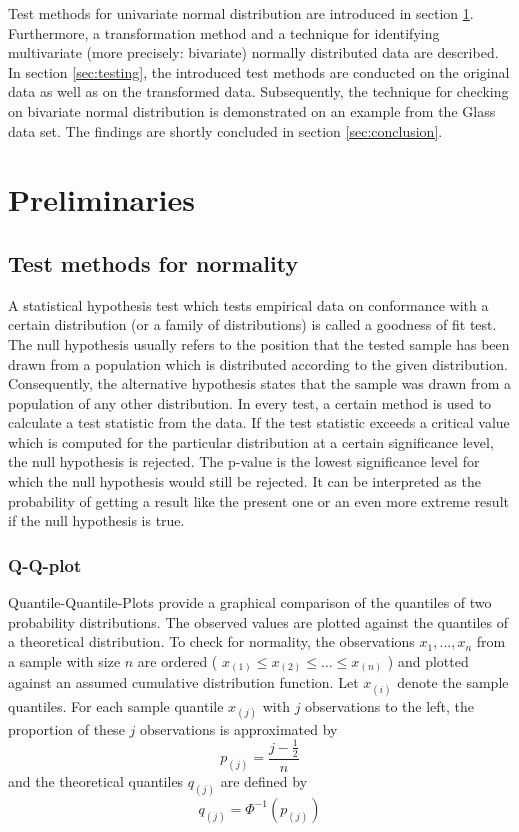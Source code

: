 \documentclass[a4paper, 12pt, titlepage, headsepline, listof = totoc, bibliography = totoc, numbers = noenddot]{scrartcl}
\begin{document}
Test methods for univariate normal distribution are introduced in section \ref{sec:preliminaries}. Furthermore, a transformation method and a technique for identifying multivariate (more precisely: bivariate) normally distributed data are described. In section \ref{sec:testing}, the introduced test methods are conducted on the original data as well as on the transformed data. Subsequently, the technique for checking on bivariate normal distribution is demonstrated on an example from the Glass data set. The findings are shortly concluded in section \ref{sec:conclusion}.

\newpage
\section{Preliminaries}\label{sec:preliminaries}

\subsection{Test methods for normality}\label{sec:methods}

A statistical hypothesis test which tests empirical data on conformance with a certain distribution (or a family of distributions) is called a goodness of fit test. The null hypothesis usually refers to the position that the tested sample has been drawn from a population which is distributed according to the given distribution. Consequently, the alternative hypothesis states that the sample was drawn from a population of any other distribution. In every test, a certain method is used to calculate a test statistic from the data. If the test statistic exceeds a critical value which is computed for the particular distribution at a certain significance level, the null hypothesis is rejected. The p-value is the lowest significance level for which the null hypothesis would still be rejected. It can be interpreted as the probability of getting a result like the present one or an even more extreme result if the null hypothesis is true.

\subsubsection{Q-Q-plot}\label{sec:qq-theoretical}

Quantile-Quantile-Plots provide a graphical comparison of the quantiles of two probability distributions. The observed values are plotted against the quantiles of a theoretical distribution. To check for normality, the observations $x_1, \dots, x_n$ from a sample with size $n$ are ordered ( $x_{(1)} \le x_{(2)} \le \dots \le x_{(n)}$ ) and plotted against an assumed cumulative distribution function. Let $x_{(i)}$ denote the sample quantiles. For each sample quantile $x_{(j)}$ with $j$ observations to the left, the proportion of these $j$ observations is approximated by
\[ p_{(j)} = \frac{j - \frac{1}{2}} {n}\]
and the theoretical quantiles $q_{(j)}$ are defined by
\[ q_{(j)} = \Phi^{-1}(p_{(j)}) \]
\end{document}
